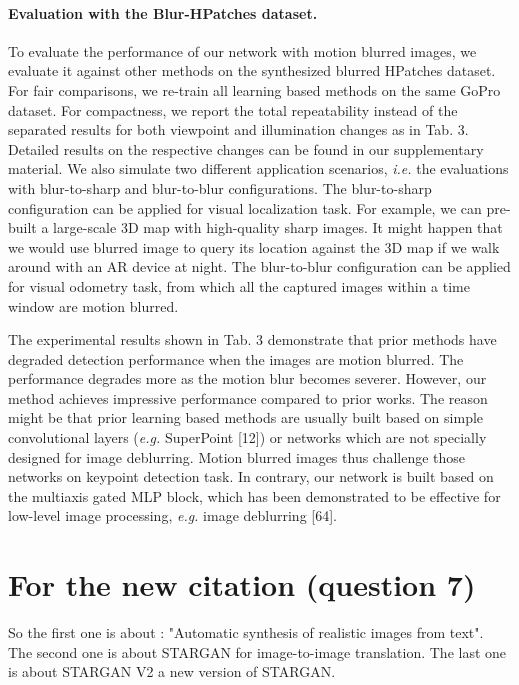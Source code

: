 \documentclass[10pt,twocolumn,letterpaper]{article}
\begin{document}
\paragraph{Evaluation with the Blur-HPatches dataset.}
To evaluate the performance of our network with motion blurred
images, we evaluate it against other methods on the synthesized blurred HPatches dataset. For fair comparisons,
we re-train all learning based methods on the same GoPro
dataset. For compactness, we report the total repeatability instead of the separated results for both viewpoint and
illumination changes as in Tab. 3. Detailed results on the
respective changes can be found in our supplementary material. We also simulate two different application scenarios,
\textit{i.e.} the evaluations with blur-to-sharp and blur-to-blur configurations. The blur-to-sharp configuration can be applied
for visual localization task. For example, we can pre-built
a large-scale 3D map with high-quality sharp images. It
might happen that we would use blurred image to query its
location against the 3D map if we walk around with an AR
device at night. The blur-to-blur configuration can be applied for visual odometry task, from which all the captured
images within a time window are motion blurred.

The experimental results shown in Tab. 3 demonstrate
that prior methods have degraded detection performance
when the images are motion blurred. The performance degrades more as the motion blur becomes severer. However,
our method achieves impressive performance compared to
prior works. The reason might be that prior learning based
methods are usually built based on simple convolutional
layers (\textit{e.g.} SuperPoint [12]) or networks which are not specially designed for image deblurring. Motion blurred images thus challenge those networks on keypoint detection
task. In contrary, our network is built based on the multiaxis gated MLP block, which has been demonstrated to be
effective for low-level image processing, \textit{e.g.} image deblurring [64].

\color{blue}
\section{For the new citation (question 7)}
So the first one is about : "Automatic synthesis of realistic images from text". \cite{reed2016generative}
The second one is about STARGAN for image-to-image translation. \cite{choi2018stargan}
The last one is about STARGAN V2 a new version of STARGAN. \cite{choi2020stargan}
\color{black}

{\small

%

}
\end{document}
